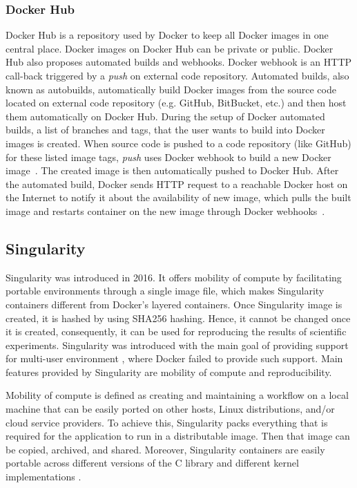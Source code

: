 \subsubsection{Docker Hub}
Docker Hub is a repository used by Docker to keep all Docker
images in one central place. Docker images on Docker Hub can be
private or public. Docker Hub also proposes automated builds and
webhooks. Docker webhook is an HTTP call-back triggered by a
\textit{push} on external code repository. Automated builds,
also known as autobuilds, automatically build Docker images
from the source code located on external code repository (e.g. GitHub,
BitBucket, etc.) and then host them automatically on Docker Hub.
During the setup of Docker automated builds, a list of branches
and tags, that the user wants to build into Docker images is created.
When source code is pushed to a code repository (like GitHub) for
these listed image tags, \textit{push} uses Docker webhook to build a new
Docker image~\cite{dockerdoc_2019}. The created image is then
automatically pushed to Docker Hub. After the automated build,
Docker sends HTTP request to a reachable Docker host on the
Internet to notify it about the availability of new image,
which pulls the built image and restarts container on the
new image through Docker webhooks~\cite{martin2018docker,dockerdoc2__2019}.

\subsection{Singularity}

Singularity was introduced in 2016. It offers mobility of compute by
facilitating portable environments through a single image file, which
makes Singularity containers different from Docker's layered containers.
Once Singularity image is created, it is hashed by using SHA256 hashing.
Hence, it cannot be changed once it is created, consequently, it can be
used for reproducing the results of scientific experiments. Singularity
was introduced with the main goal of providing support for multi-user
environment \cite{Singularity}, where Docker failed to provide such
support. Main features provided by Singularity are mobility of compute
and reproducibility.

Mobility of compute is defined as creating and maintaining a workflow
on a local machine that can be easily ported on other hosts, Linux
distributions, and/or cloud service providers. To achieve this,
Singularity packs everything that is required for the application
to run in a distributable image. Then that image can be copied,
archived, and shared. Moreover, Singularity containers are easily
portable across different versions of the C library and different
kernel implementations \cite{kurtzer2017singularity}.

